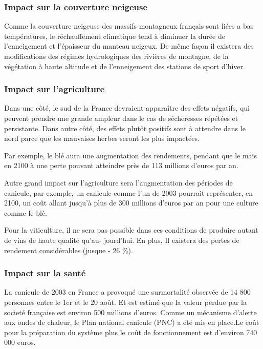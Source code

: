 \documentclass[a4paper,11pt]{article}
\begin{document}
\subsubsection*{Impact sur la couverture neigeuse}
Comme la  couverture neigeuse des massifs  montagneux français sont  liées a bas
températures,  le   réchauffement  climatique  tend  à  diminuer   la  durée  de
l’enneigement et l’épaisseur  du manteau neigeux. De même  façon il existera des
modifications  des  régimes  hydrologiques  des  rivières  de  montagne,  de  la
végétation à haute altitude et de l’enneigement des stations de sport d’hiver. 


\subsubsection*{Impact sur l’agriculture}
Dans une côté, le sud de la France devraient apparaître des effets négatifs, qui
peuvent  prendre une  grande  ampleur dans  le  cas de  sécheresses répétées  et
persistante. Dans autre côté, des effets plutôt positifs sont à attendre dans le
nord parce que les mauvaises herbes seront les plus impactées.

Par exemple, le blé aura une augmentation des rendements, pendant que le maïs en 2100
à une perte pouvant atteindre près de 113 millions d’euros par an.

Autre  grand  impact  sur  l'agriculture  sera l'augmentation  des  périodes  de
canicule, par exemple,  un canicule comme l'un de  2003 pourrait représenter, en
2100,  un coût  allant jusqu’à  plus de  300 millions  d’euros par  an  pour une
culture comme le blé.  

Pour la viticulture, il ne sera pas
possible dans ces conditions de produire autant de vins de haute qualité qu’au-
jourd’hui. En plus, Il existera des pertes de rendement considérables (jusque - 26 \%).

\subsubsection*{Impact sur la santé }
La canicule de 2003 en France a provoqué une surmortalité observée de 14 800
personnes entre le 1er et le 20 août.  Et est estimé que la valeur perdue par la
societé française est environ 500 millions d’euros.
Comme un mécanisme d'alerte aux ondes de chaleur, le Plan national canicule
(PNC) a été mis en place.Le coût  pour la préparation du système plus le coût de
fonctionnement est d'environ 740 000 euros. 
\end{document}
